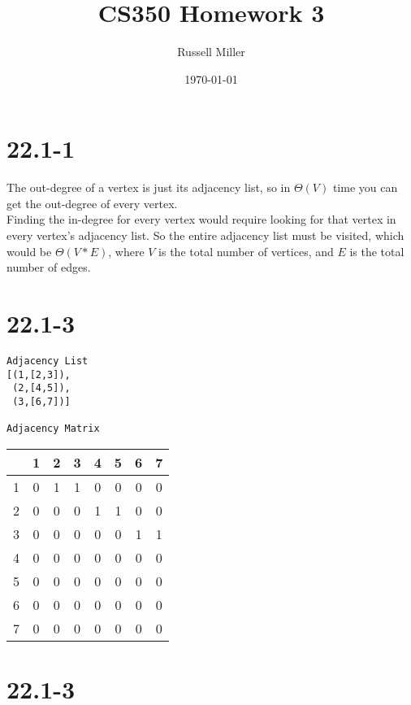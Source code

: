 \documentclass{article}
\title{CS350 Homework 3}
\author{Russell Miller}
\date{\today}
\begin{document}
\maketitle

\section*{22.1-1}
The out-degree of a vertex is just its adjacency list, so in $\Theta(V)$
time you can get the out-degree of every vertex.\\
Finding the in-degree for every vertex would require looking for that
vertex in every vertex's adjacency list. So the entire adjacency list 
must be visited, which would be $\Theta(V*E)$, where $V$ is the total
number of vertices, and $E$ is the total number of edges.\\

\section*{22.1-3}
\begin{verbatim}
Adjacency List
[(1,[2,3]),
 (2,[4,5]),
 (3,[6,7])]

Adjacency Matrix
\end{verbatim}
\begin{tabular}{|c|c c c c c c c|}
\hline
 &1&2&3&4&5&6&7\\
\hline
1&0&1&1&0&0&0&0\\
2&0&0&0&1&1&0&0\\
3&0&0&0&0&0&1&1\\
4&0&0&0&0&0&0&0\\
5&0&0&0&0&0&0&0\\
6&0&0&0&0&0&0&0\\
7&0&0&0&0&0&0&0\\
\hline
\end{tabular}

\section*{22.1-3}
\end{document}
